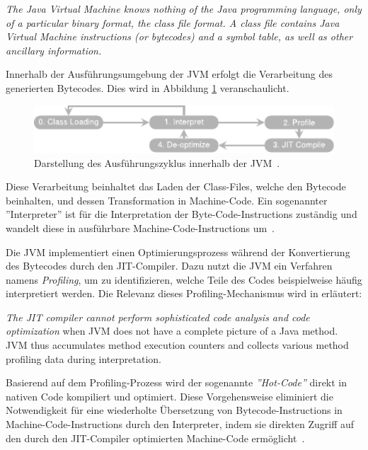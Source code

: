  \begin{spar}
 \textit{The Java Virtual Machine knows nothing of the Java programming language, only of a particular binary format, the class file format. A class file contains Java Virtual Machine instructions (or bytecodes) and a symbol table, as well as other ancillary information. \parencite{Lindholm2023JavaVM}}
 \end{spar}

Innerhalb der Ausführungsumgebung der \ac{JVM} erfolgt die Verarbeitung des generierten Bytecodes. Dies wird in Abbildung \ref{fig:JVMEXEC} veranschaulicht.
\newline
 \begin{figure}[H]
    \centering
    \includegraphics[width=12cm]{images/40_concept/path127.pdf}
    \caption[Darstellung des Ausführungszyklus innerhalb der \ac{JVM}]{Darstellung des Ausführungszyklus innerhalb der \ac{JVM}~\parencite[vgl.][]{9678709}{}{}.}
    \label{fig:JVMEXEC}
\end{figure}
Diese Verarbeitung beinhaltet das Laden der Class-Files, welche den Bytecode beinhalten, und dessen Transformation in Machine-Code. Ein sogenannter ''Interpreter'' ist für die Interpretation der Byte-Code-Instructions zuständig und wandelt diese in ausführbare Machine-Code-Instructions um~\parencite{Lindholm2023JavaVM}.

Die \ac{JVM} implementiert einen Optimierungsprozess während der Konvertierung des Bytecodes durch den \ac{JIT}-Compiler. Dazu nutzt die \ac{JVM} ein Verfahren namens \textit{Profiling}, um zu identifizieren, welche Teile des Codes beispielweise häufig interpretiert werden. Die Relevanz dieses Profiling-Mechanismus wird in \textit{} erläutert:

\begin{spar}
\textit{The JIT compiler cannot perform sophisticated code analysis and code optimization} when JVM does not have a complete picture of a Java method. JVM thus accumulates method execution counters and collects various method profiling data during interpretation.~\parencite[][]{9678709}{}{}
\end{spar}

Basierend auf dem Profiling-Prozess wird der sogenannte \textit{''Hot-Code''} direkt in nativen Code kompiliert und optimiert. Diese Vorgehensweise eliminiert die Notwendigkeit für eine wiederholte Übersetzung von Bytecode-Instructions in Machine-Code-Instructions durch den Interpreter, indem sie direkten Zugriff auf den durch den JIT-Compiler optimierten Machine-Code ermöglicht~\parencite{Lindholm2023JavaVM}.


